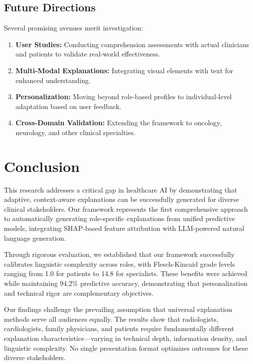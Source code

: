 \documentclass{ieeeaccess}
\begin{document}
\subsection{Future Directions}

Several promising avenues merit investigation:

\begin{enumerate}
\item \textbf{User Studies:} Conducting comprehension assessments with actual clinicians and patients to validate real-world effectiveness.

\item \textbf{Multi-Modal Explanations:} Integrating visual elements with text for enhanced understanding.

\item \textbf{Personalization:} Moving beyond role-based profiles to individual-level adaptation based on user feedback.

\item \textbf{Cross-Domain Validation:} Extending the framework to oncology, neurology, and other clinical specialties.
\end{enumerate}


\section{Conclusion}
\label{sec:conclusion}

This research addresses a critical gap in healthcare AI by demonstrating that adaptive, context-aware explanations can be successfully generated for diverse clinical stakeholders. Our framework represents the first comprehensive approach to automatically generating role-specific explanations from unified predictive models, integrating SHAP-based feature attribution with LLM-powered natural language generation.

Through rigorous evaluation, we established that our framework successfully calibrates linguistic complexity across roles, with Flesch-Kincaid grade levels ranging from 1.0 for patients to 14.8 for specialists. These benefits were achieved while maintaining 94.2\% predictive accuracy, demonstrating that personalization and technical rigor are complementary objectives.

Our findings challenge the prevailing assumption that universal explanation methods serve all audiences equally. The results show that radiologists, cardiologists, family physicians, and patients require fundamentally different explanation characteristics---varying in technical depth, information density, and linguistic complexity. No single presentation format optimizes outcomes for these diverse stakeholders.
\end{document}
